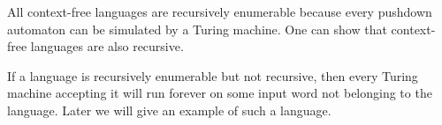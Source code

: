 

\setcounter{section}{8}
\setcounter{subsection}{1}
\setcounter{dfn}{3}

All context-free languages are recursively enumerable because every pushdown automaton can be simulated by a Turing machine.
One can show that context-free languages are also recursive.

If a language is recursively enumerable but not recursive,
then every Turing machine accepting it will run forever on some input word not belonging to the language.
Later we will give an example of such a language.



